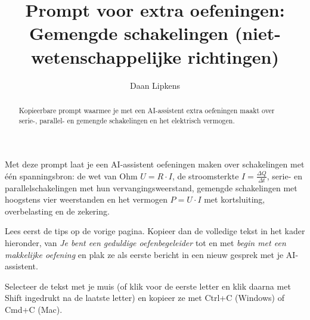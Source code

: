 \documentclass{ximera}
\title{Prompt voor extra oefeningen: Gemengde schakelingen (niet-wetenschappelijke richtingen)}
\author{Daan Lipkens}
\begin{document}
\begin{abstract}
    Kopieerbare prompt waarmee je met een AI-assistent extra oefeningen maakt over serie-, parallel- en gemengde schakelingen en het elektrisch vermogen.
\end{abstract}
\maketitle

Met deze prompt laat je een AI-assistent oefeningen maken over schakelingen met één spanningsbron: de wet van Ohm $U = R \cdot I$, de stroomsterkte $I = \frac{\Delta Q}{\Delta t}$, serie- en parallelschakelingen met hun vervangingsweerstand, gemengde schakelingen met hoogstens vier weerstanden en het vermogen $P = U \cdot I$ met kortsluiting, overbelasting en de zekering.

Lees eerst de tips op de vorige pagina. Kopieer dan de volledige tekst in het kader hieronder, van \textit{Je bent een geduldige oefenbegeleider} tot en met \textit{begin met een makkelijke oefening} en plak ze als eerste bericht in een nieuw gesprek met je AI-assistent.

\begin{onlineOnly}
    Selecteer de tekst met je muis (of klik voor de eerste letter en klik daarna met Shift ingedrukt na de laatste letter) en kopieer ze met Ctrl+C (Windows) of Cmd+C (Mac).
\end{onlineOnly}
\end{document}
